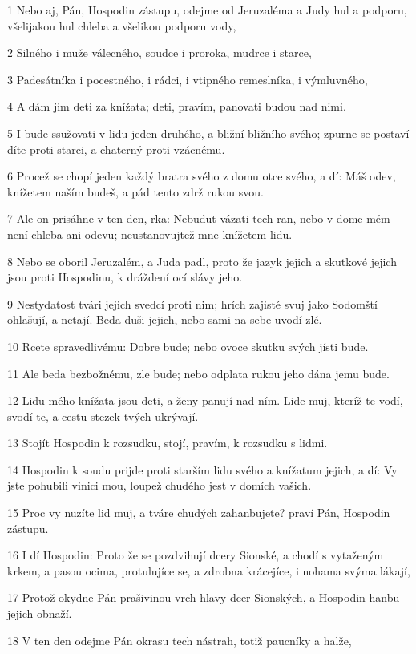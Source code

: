 \par 1 Nebo aj, Pán, Hospodin zástupu, odejme od Jeruzaléma a Judy hul a podporu, všelijakou hul chleba a všelikou podporu vody,
\par 2 Silného i muže válecného, soudce i proroka, mudrce i starce,
\par 3 Padesátníka i pocestného, i rádci, i vtipného remeslníka, i výmluvného,
\par 4 A dám jim deti za knížata; deti, pravím, panovati budou nad nimi.
\par 5 I bude ssužovati v lidu jeden druhého, a bližní bližního svého; zpurne se postaví díte proti starci, a chaterný proti vzácnému.
\par 6 Procež se chopí jeden každý bratra svého z domu otce svého, a dí: Máš odev, knížetem naším budeš, a pád tento zdrž rukou svou.
\par 7 Ale on prisáhne v ten den, rka: Nebudut vázati tech ran, nebo v dome mém není chleba ani odevu; neustanovujtež mne knížetem lidu.
\par 8 Nebo se oboril Jeruzalém, a Juda padl, proto že jazyk jejich a skutkové jejich jsou proti Hospodinu, k dráždení ocí slávy jeho.
\par 9 Nestydatost tvári jejich svedcí proti nim; hrích zajisté svuj jako Sodomští ohlašují, a netají. Beda duši jejich, nebo sami na sebe uvodí zlé.
\par 10 Rcete spravedlivému: Dobre bude; nebo ovoce skutku svých jísti bude.
\par 11 Ale beda bezbožnému, zle bude; nebo odplata rukou jeho dána jemu bude.
\par 12 Lidu mého knížata jsou deti, a ženy panují nad ním. Lide muj, kteríž te vodí, svodí te, a cestu stezek tvých ukrývají.
\par 13 Stojít Hospodin k rozsudku, stojí, pravím, k rozsudku s lidmi.
\par 14 Hospodin k soudu prijde proti starším lidu svého a knížatum jejich, a dí: Vy jste pohubili vinici mou, loupež chudého jest v domích vašich.
\par 15 Proc vy nuzíte lid muj, a tváre chudých zahanbujete? praví Pán, Hospodin zástupu.
\par 16 I dí Hospodin: Proto že se pozdvihují dcery Sionské, a chodí s vytaženým krkem, a pasou ocima, protulujíce se, a zdrobna krácejíce, i nohama svýma lákají,
\par 17 Protož okydne Pán prašivinou vrch hlavy dcer Sionských, a Hospodin hanbu jejich obnaží.
\par 18 V ten den odejme Pán okrasu tech nástrah, totiž paucníky a halže,

